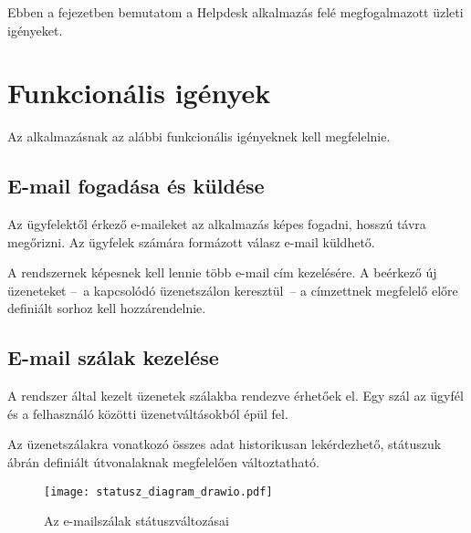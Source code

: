Ebben a fejezetben bemutatom a \foreignlanguage{british}{Helpdesk} alkalmazás felé megfogalmazott üzleti igényeket.



\section{Funkcionális igények}
Az alkalmazásnak az alábbi funkcionális igényeknek kell megfelelnie.


\subsection{E-mail fogadása és küldése}\label{sec:email_fogadas_kuldes}
Az ügyfelektől érkező e-maileket az alkalmazás képes fogadni, hosszú távra megőrizni. Az ügyfelek számára formázott válasz e-mail küldhető.

A rendszernek képesnek kell lennie több e-mail cím kezelésére. A beérkező új üzeneteket --~a kapcsolódó üzenetszálon keresztül~-- a címzettnek megfelelő előre definiált sorhoz kell hozzárendelnie.



\subsection{E-mail szálak kezelése}
A rendszer által kezelt üzenetek szálakba rendezve érhetőek el. Egy szál az ügyfél és a felhasználó közötti üzenetváltásokból épül fel.

Az üzenetszálakra vonatkozó összes adat historikusan lekérdezhető, státuszuk  ábrán definiált útvonalaknak megfelelően változtatható.


\begin{figure}[hbt] 
	\centering
	\texttt{[image: statusz\_diagram\_drawio.pdf]}
	\caption{Az e-mailszálak státuszváltozásai}
	\label{fig:statusz_diagram}
\end{figure}



